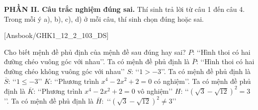 \documentclass[12pt,a4paper,openany,oneside]{book}
\newcommand{\phanDe}[1]{\par\medskip\noindent #1\par\smallskip}
\begin{document}

\phanDe{\textbf{PHẦN II. Câu trắc nghiệm đúng sai.} Thí sinh trả lời từ câu 1 đến câu 4. Trong mỗi ý a), b), c), d) ở mỗi câu, thí sinh chọn đúng hoặc sai.}

\setcounter{ex}{0}

[Ansbook/GHK1_12_2_103_DS]

\begin{ex}%
	Cho biết mệnh đề phủ định của mệnh đề sau  đúng hay sai?
	\choiceTF 
		{$P$: \lq\lq Hình thoi có hai đường chéo vuông góc với nhau\rq\rq. Ta  có mệnh đề phủ định là $\overline{P}$: \lq\lq Hình thoi có hai đường chéo không vuông góc với nhau\rq\rq}
		{$S$: \lq\lq $1>-3$\rq\rq.  Ta có mệnh đề phủ định là $\overline{S}$: \lq\lq $1\leq-3$\rq\rq}
		 {\True $K$: \lq\lq Phương trình $x^4-2x^2+2=0$ có nghiệm\rq\rq. Ta có mệnh đề phủ định là $\overline{K}$: \lq\lq Phương trình $x^4-2x^2+2=0$ vô nghiệm\rq\rq}
		{$H$: \lq\lq $(\sqrt{3}-\sqrt{12})^2=3$\rq\rq. Ta có mệnh đề phủ định là  $\overline{H}:$ \lq\lq $(\sqrt{3}-\sqrt{12})^2\neq 3$\rq\rq}
\end{ex}
\end{document}
